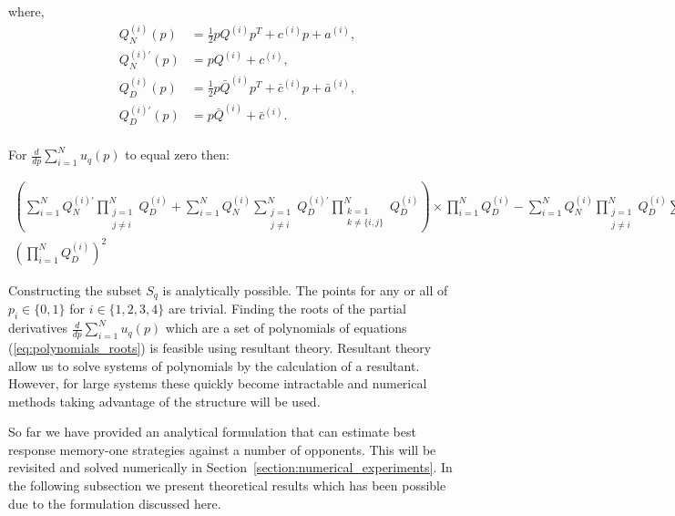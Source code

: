\documentclass[10pt]{article}
\begin{document}
where,
{\scriptsize
\begin{align*}
    Q_{N}^{(i) }(p) & = \frac{1}{2} pQ^{(i)} p^T + c^{(i)} p + a^ {(i)}, \\
    Q_{N}^{(i)'}(p) & =  pQ^{(i)} + c^{(i)}, \\
    Q_{D}^{(i) }(p) & = \frac{1}{2} p\bar{Q}^{(i)} p^T + \bar{c}^{(i)} p + \bar{a}^ {(i)}, \\
    Q_{D}^{(i)'}(p) & =  p\bar{Q}^{(i)} + \bar{c}^{(i)}. \\
\end{align*}}

For \(\frac{d}{dp} \sum\limits_{i=1} ^ N  u_q(p)\) to equal zero then:

{\scriptsize
\begin{align}\label{eq:polynomials_roots}
    \left( \displaystyle\sum\limits_{i=1} ^ {N} Q_{N}^{(i)'} \prod_{\substack{j=1 \\ j \neq i}} ^ N Q_{D}^{(i)}
    + \sum\limits_{i=1} ^ {N} Q_{N}^{(i)} \sum_{\substack{j=1 \\ j \neq i}} ^ {N} Q_{D}^{(i)'}
    \prod_{\substack{k=1 \\ k \neq \{i, j\}}} ^ N Q_{D}^{(i)}\right) \times
  \prod\limits_{i=1} ^ N Q_{D}^{(i)}
 - \displaystyle \sum\limits_{i=1} ^ {N} Q_{N}^{(i)} \prod_{\substack{j=1 \\ j \neq i}} ^ N Q_{D}^{(i)}
  \sum\limits_{k=1} ^ {N} Q_{N}^{(i)'} \prod_{\substack{l=1 \\ l \neq k}} ^ N Q_{D}^{(i)} &= 0, \quad {while} \\
   \left(\prod\limits_{i=1} ^ N Q_{D}^{(i)}\right)^{2} &\neq 0.
\end{align}}

Constructing the subset \(S_q\) is analytically possible. The points for any or
all of \(p_i \in \{0, 1\}\) for \(i \in \{1, 2, 3, 4\}\) are trivial. Finding the
roots of the partial derivatives \(\frac{d}{dp} \sum\limits_{i=1} ^ N  u_q(p)\)
which are a set of polynomials of equations (\ref{eq:polynomials_roots})
is feasible using resultant theory. Resultant theory~\cite{Jonsson2005} allow us
to solve systems of polynomials by the calculation of a resultant. However, for
large systems these quickly become intractable and numerical methods taking
advantage of the structure will be used.

So far we have provided an analytical formulation that can estimate best
response memory-one strategies against a number of opponents. This will be
revisited and solved numerically in Section~\ref{section:numerical_experiments}.
In the following subsection we present theoretical results which has been
possible due to the formulation discussed here.
\end{document}
